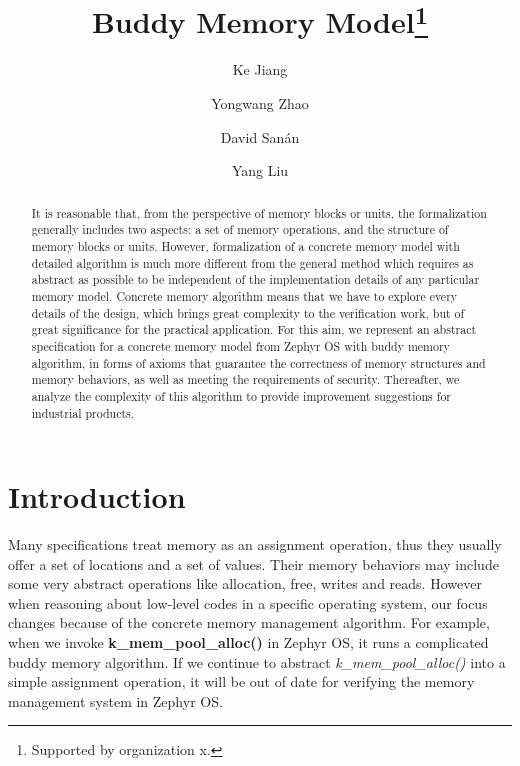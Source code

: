\documentclass[runningheads]{llncs}
\begin{document}
\title{Buddy Memory Model\thanks{Supported by organization x.}}



\author{Ke Jiang \and
		Yongwang Zhao \and
		David San\'{a}n \and
		Yang Liu}




\maketitle              


\begin{abstract}
It is reasonable that, from the perspective of memory blocks or units, the formalization generally includes two aspects: a set of memory operations, and the structure of memory blocks or units. However, formalization of a concrete memory model with detailed algorithm is much more different from the general method which requires as abstract as possible to be independent of the implementation details of any particular memory model. Concrete memory algorithm means that we have to explore every details of the design, which brings great complexity to the verification work, but of great significance for the practical application. For this aim, we represent an abstract specification for a concrete memory model from Zephyr OS with buddy memory algorithm, in forms of axioms that guarantee the correctness of memory structures and memory behaviors, as well as meeting the requirements of security. Thereafter, we analyze the complexity of this algorithm to provide improvement suggestions for industrial products.

\end{abstract}


\section{Introduction}
Many specifications treat memory as an assignment operation, thus they usually offer a set of locations and a set of values. Their memory behaviors may include some very abstract operations like allocation, free, writes and reads. However when reasoning about low-level codes in a specific operating system, our focus changes because of the concrete memory management algorithm. For example, when we invoke \textbf{k\_mem\_pool\_alloc()} in Zephyr OS, it runs a complicated buddy memory algorithm. If we continue to abstract \textsl{k\_mem\_pool\_alloc()} into a simple assignment operation, it will be out of date for verifying the memory management system in Zephyr OS.
\end{document}
